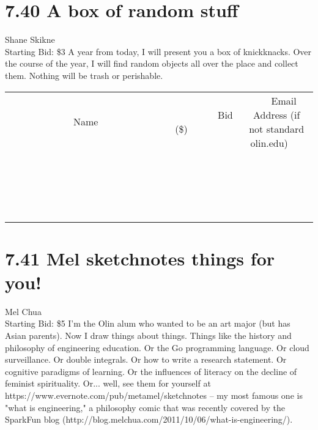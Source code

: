 \documentclass[11pt]{article}
\begin{document}
\section*{7.40 A box of random stuff}
Shane Skikne
\\
Starting Bid: \$3
\newline
A year from today, I will present you a box of knickknacks. Over the course of the year, I will find random objects all over the place and collect them. Nothing will be trash or perishable.
\\[3ex]
\begin{tabular}{c c c}
~~~~~~~~~~~~~Name~~~~~~~~~~~~~ & ~~~~~~~~~Bid (\$)~~~~~~~~~  & ~~~Email Address (if not standard olin.edu)~~~\\
 & & \\
\hline
 & & \\
\hline
 & & \\
\hline
 & & \\
\hline
 & & \\
\hline
 & & \\
\hline
 & & \\
\hline
 & & \\
\hline
 & & \\
\hline
 & & \\
\hline
 & & \\
\hline
 & & \\
\hline
 & & \\
\hline
 & & \\
\hline
 & & \\
\hline
 & & \\
\hline
 & & \\
\hline
 & & \\
\hline
 & & \\
\hline
\end{tabular}
\newpage
\section*{7.41 Mel sketchnotes things for you!}
Mel Chua
\\
Starting Bid: \$5
\newline
I'm the Olin alum who wanted to be an art major (but has Asian parents). Now I draw things about things. Things like the history and philosophy of engineering education. Or the Go programming language. Or cloud surveillance. Or double integrals. Or how to write a research statement. Or cognitive paradigms of learning. Or the influences of literacy on the decline of feminist spirituality. Or... well, see them for yourself at https://www.evernote.com/pub/metamel/sketchnotes -- my most famous one is "what is engineering," a philosophy comic that was recently covered by the SparkFun blog (http://blog.melchua.com/2011/10/06/what-is-engineering/).
\end{document}
